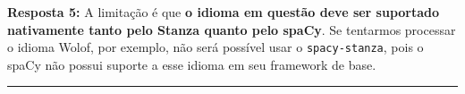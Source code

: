 \documentclass[
  brazilian,
]{article}
\begin{document}
\textbf{Resposta 5:} A limitação é que \textbf{o idioma em questão deve
ser suportado nativamente tanto pelo Stanza quanto pelo spaCy}. Se
tentarmos processar o idioma Wolof, por exemplo, não será possível usar
o \texttt{spacy-stanza}, pois o spaCy não possui suporte a esse idioma
em seu framework de base.

\begin{center}\rule{0.5\linewidth}{0.5pt}\end{center}
\end{document}
